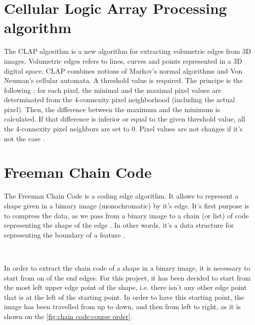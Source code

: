 \newpage 


\section[CLAP]{Cellular Logic Array Processing algorithm}

The \acrfull{CLAP} algorithm is a new algorithm for extracting volumetric edges from 3D images. Volumetric edges refers to lines, curves and points represented in a 3D digital space. \gls{CLAP} combines notions of Markov's normal algorithms and Von Neuman's cellular automata. A threshold value is required. The principe is the following : for each pixel, the minimal and the maximal pixel values are determinated from the 4-connexity pixel neighborhood (including the actual pixel). Then, the difference between the maximum and the minimum is calculated. If that difference is inferior or equal to the given  threshold value, all the 4-connexity pixel neighbors are set to 0. Pixel values are not changes if it's not the case \cite{bib:filter:EdgeWithCLAP}.







\section{Freeman Chain Code}



The Freeman Chain Code is a coding edge algorithm. It allows to represent a shape given in a bimary image (monochromatic) by it's edge. It's first purpose is to compress the data, as we pass from a binary image to a chain (or list) of code representing the shape of the edge \cite{bib:chain:ParametreGeometriqueChaineFreeman}. In other words, it's a data structure for representing the boundary of a feature \cite{bib:chain:DigitalImageProcessing}.

~~ 

In order to extract the chain code of a shape in a binary image, it is necessary to start from on of the end edges. For this project, it has been decided to start from the most left upper edge point of the shape, i.e. there isn't any other edge point that is at the left of the starting point. In order to have this starting point, the image has been travelled from up to down, and then from left to right, as it is shown on the \vref{fig:chain code:course order}.


